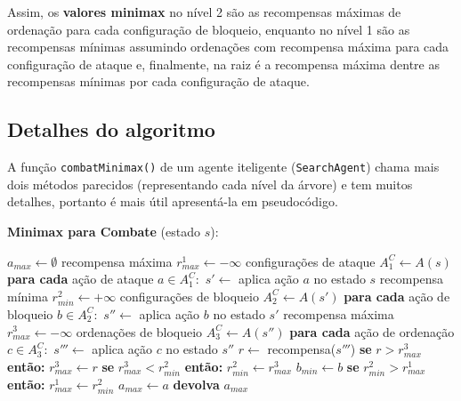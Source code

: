 Assim, os \textbf{valores minimax} no nível 2 são as recompensas máximas de ordenação para cada configuração de bloqueio, enquanto no nível 1 são as recompensas mínimas assumindo ordenações com recompensa máxima para cada configuração de ataque e, finalmente, na raiz é a recompensa máxima dentre as recompensas mínimas por cada configuração de ataque.

\subsection{Detalhes do algoritmo}

A função \texttt{combatMinimax()} de um agente iteligente (\texttt{SearchAgent}) chama mais dois métodos parecidos (representando cada nível da árvore) e tem muitos detalhes, portanto é mais útil apresentá-la em pseudocódigo.

\begin{algorithm}
\caption*{\textbf{Minimax para Combate} (estado $s$):}
\begin{algorithmic}
  \STATE $a_{max} \gets \emptyset$
  \STATE recompensa máxima $r^1_{max} \gets -\infty$
  \STATE configurações de ataque $A^C_1 \gets A(s)$
  \STATE \textbf{para cada} ação de ataque $a \in A^C_1:$
    \STATE \ind $s' \gets $ aplica ação $a$ no estado $s$
    \STATE \ind recompensa mínima $r^2_{min} \gets +\infty$
    \STATE \ind configurações de bloqueio $A^C_2 \gets A(s')$
    \STATE
    \STATE \ind \textbf{para cada} ação de bloqueio $b \in A^C_2:$
      \STATE \ind \ind $s'' \gets $ aplica ação $b$ no estado $s'$
      \STATE \ind \ind recompensa máxima $r^3_{max} \gets -\infty$
      \STATE \ind \ind ordenações de bloqueio $A^C_3 \gets A(s'')$
      \STATE
      \STATE \ind \ind \textbf{para cada} ação de ordenação $c \in A^C_3:$
        \STATE \ind \ind \ind $s'''\gets $ aplica ação $c$ no estado $s''$
        \STATE \ind \ind \ind $r \gets $ recompensa($s'''$)
        \STATE \ind \ind \ind \textbf{se } $r > r^3_{max}$ \textbf{então: }
        \STATE \ind \ind \ind \ind $r^3_{max} \gets r$
      \STATE
      \STATE \ind \ind \textbf{se } $r^3_{max} < r^2_{min}$ \textbf{então: }
      \STATE \ind \ind \ind $r^2_{min} \gets r^3_{max}$
      \STATE \ind \ind \ind $b_{min} \gets b$
    \STATE
    \STATE \ind \textbf{se } $r^2_{min} > r^1_{max}$ \textbf{então: }
    \STATE \ind \ind $r^1_{max} \gets r^2_{min}$
    \STATE \ind \ind $a_{max} \gets a$
    \STATE
    \STATE \textbf{devolva } $a_{max}$
\end{algorithmic}
\end{algorithm}

